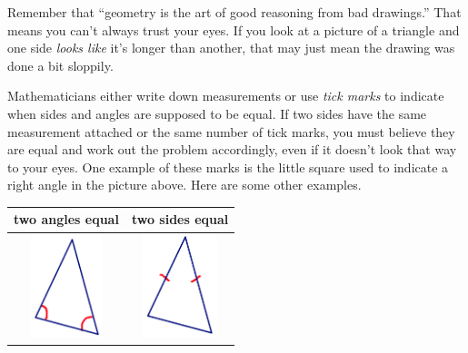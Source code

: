 \newpage



Remember that ``geometry is the art of good reasoning from bad drawings.'' That means you can't always trust your eyes.  If you look at a picture of a triangle and one side \emph{looks like} it's longer than another, that may just mean the drawing was done a bit sloppily.

Mathematicians either write down measurements or use \emph{tick marks} to indicate when sides and angles are supposed to be equal.  If two sides have the same measurement attached or the same number of tick marks, you must believe they are equal and work out the problem accordingly, even if it doesn't look that way to your eyes.  One example of these marks is the little square used to indicate a right angle in the picture above.  Here are some other examples.

\bigskip



\begin{center}
\begin{tabular}{c|c}\hline
{\bf two angles equal } & {\bf two sides equal} \\
\hline
\includegraphics[height=3cm]{2eqangs} & 
\includegraphics[height=3cm]{2eqsides}  \\
\hline
\end{tabular}

\end{center}



\bigskip
\bigskip


